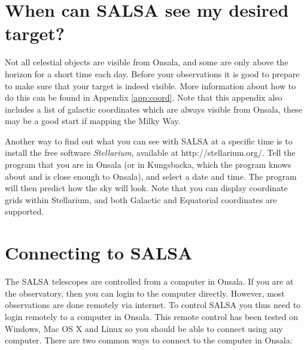 %

\section{When can SALSA see my desired target?}
Not all celestial objects are visible from Onsala, and some are only above the
horizon for a short time each day. Before your observations it is good to
prepare to make sure that your target is indeed visible. More information about
how to do this can be found in Appendix \ref{app:coord}. Note that this
appendix also includes a list of galactic coordinates which are always visible
from Onsala, these may be a good start if mapping the Milky Way. 

Another way to find out what you can see with SALSA at a specific time is to
install the free software \emph{Stellarium}, available at
http://stellarium.org/.  Tell the program that you are in Onsala (or in
Kungsbacka, which the program knows about and is close enough to Onsala), and
select a date and time.  The program will then predict how the sky will look.
Note that you can display coordinate grids within Stellarium, and both Galactic
and Equatorial coordinates are supported.

\section{Connecting to SALSA} 
\label{sect:connect}
The SALSA telescopes are controlled from a computer in Onsala. If you are at
the observatory, then you can login to the computer directly. However, most
observations are done remotely via internet. To control SALSA you thus need to
login remotely to a computer in Onsala. This remote control has been tested
on Windows, Mac OS X and Linux so you should be able to connect using any 
computer. There are two common ways to connect to the computer in Onsala:

